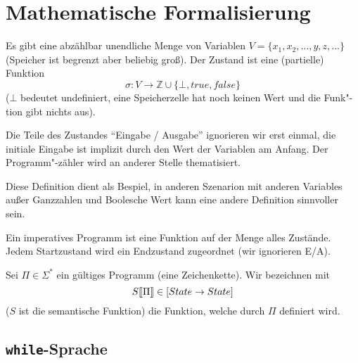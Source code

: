 \section{Mathematische Formalisierung}

\begin{definition}[Zustand]
    Es gibt eine abzählbar unendliche Menge von Variablen $V = \{ x_1, x_2, \dots, y, z, \dots \}$ (Speicher ist begrenzt aber beliebig groß). Der Zustand ist eine (partielle) Funktion \[
    \sigma: V \to \mathbb{Z} \cup \{ \bot, true, false \}
    \]
    ($\bot$ bedeutet undefiniert, \dh{} eine Speicherzelle hat noch keinen Wert und die Funk"-tion gibt nichts aus).

    Die Teile des Zustandes ``Eingabe / Ausgabe'' ignorieren wir erst einmal, \dh{} die initiale Eingabe ist implizit durch den Wert der Variablen am Anfang. Der Programm"-zähler wird an anderer Stelle thematisiert.
\end{definition}

\begin{remark}
    Diese Definition dient als Bespiel, \dh{} in anderen Szenarion mit anderen Variables außer Ganzzahlen und Boolesche Wert kann eine andere Definition sinnvoller sein.
\end{remark}

\begin{definition}
    Ein imperatives Programm ist eine Funktion auf der Menge alles Zustände. Jedem Startzustand wird ein Endzustand zugeordnet (wir ignorieren E/A).
\end{definition}

\begin{notation}
    Sei $\Pi \in \Sigma^*$ ein gültiges Programm (eine Zeichenkette). Wir bezeichnen mit
    \[
    S\mathrm{[}\kern-.14em\mathrm{[}\Pi\mathrm{]}\kern-.14em\mathrm{]} \in [State \to State]
    \]
    ($S$ ist die semantische Funktion) die Funktion, welche durch $\Pi$ definiert wird.
\end{notation}



\subsection{\texttt{while}-Sprache}\label{section:while}

